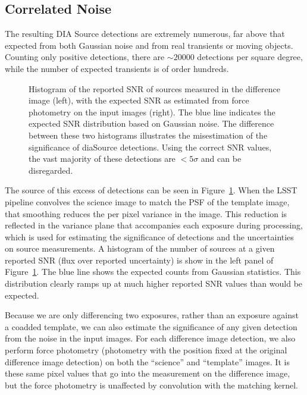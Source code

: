 \subsection{Correlated Noise}

The resulting DIA Source detections are extremely numerous, far above that
expected from both Gaussian noise and from real transients or moving objects.
Counting only positive detections, there are $\sim 20 000$ detections per
square degree, while the number of expected transients is of order hundreds.

\begin{figure}
  \centering
  \caption{
  Histogram of the reported SNR of sources measured in the difference image
  (left), with the expected SNR as estimated from force photometry on the input
  images (right). The blue line indicates the expected SNR distribution based
  on Gaussian noise. The difference between these two histograms illustrates the
  misestimation of the significance of diaSource detections. Using the correct
  SNR values, the vast majority of these detections are $<5 \sigma$ and can be
  disregarded.
  }
  \label{fig:snr_comparison}
\end{figure}

The source of this excess of detections can be seen in
Figure~\ref{fig:snr_comparison}. When the LSST pipeline convolves the science
image to match the PSF of the template image, that smoothing reduces the per
pixel variance in the image. This reduction is reflected in the variance plane
that accompanies each exposure during processing, which is used for estimating
the significance of detections and the uncertainties on source measurements. A
histogram of the number of sources at a given reported SNR (flux over reported
uncertainty) is show in the left panel of Figure~\ref{fig:snr_comparison}. The
blue line shows the expected counts from Gaussian statistics. This distribution
clearly ramps up at much higher reported SNR values than would be expected.

Because we are only differencing two exposures, rather than an exposure against
a coadded template, we can also estimate the significance of any given detection
from the noise in the input images. For each difference image detection, we also
perform force photometry (photometry with the position fixed at the original
difference image detection) on both the ``science'' and ``template'' images. It
is these same pixel values that go into the measurement on the difference image,
but the force photometry is unaffected by convolution with the matching kernel.

